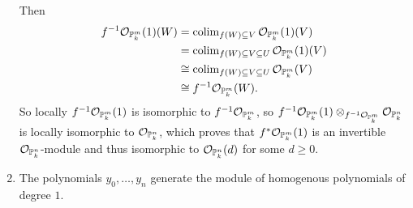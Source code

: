 \begin{exercise}{3}
\begin{enumerate}
{            Then 
            \begin{align*}
                f^{-1} \mathcal{O}_{\mathbb{P}^m_k}(1) (W) &= \operatorname{colim}_{f(W) \subseteq
                V} \mathcal{O}_{\mathbb{P}^m_k} (1) (V) \\
                &= \operatorname{colim}_{f(W) \subseteq V \subseteq U} \mathcal{O}_{\mathbb{P}^m_k}
                (1) (V) \\
                &\cong \operatorname{colim}_{f(W) \subseteq V \subseteq U} \mathcal{O}_{\mathbb{P}^m_k}
                (V) \\
                &\cong f^{-1} \mathcal{O}_{\mathbb{P}^m_k} (W).
            \end{align*}
            So locally $f^{-1} \mathcal{O}_{\mathbb{P}^m_k}(1)$ is isomorphic to
            $f^{-1} \mathcal{O}_{\mathbb{P}^m_k}$, so $f^{-1}
            \mathcal{O}_{\mathbb{P}^m_k}(1) \otimes_{f^{-1} \mathcal{O}_{\mathbb{P}^m_k}}
            \mathcal{O}_{\mathbb{P}^n_k}$ is locally isomorphic to
            $\mathcal{O}_{\mathbb{P}^n_k}$, which proves that $f^*
            \mathcal{O}_{\mathbb{P}^m_k}(1)$ is an invertible
            $\mathcal{O}_{\mathbb{P}^n_k}$-module and thus isomorphic to
            $\mathcal{O}_{\mathbb{P}^n_k}(d)$ for some $d \geq 0$.
            }
        \item{The polynomials $y_0, \dots, y_n$ generate the module of
            homogenous polynomials of degree $1$.
            }
    \end{enumerate}
\end{exercise}

